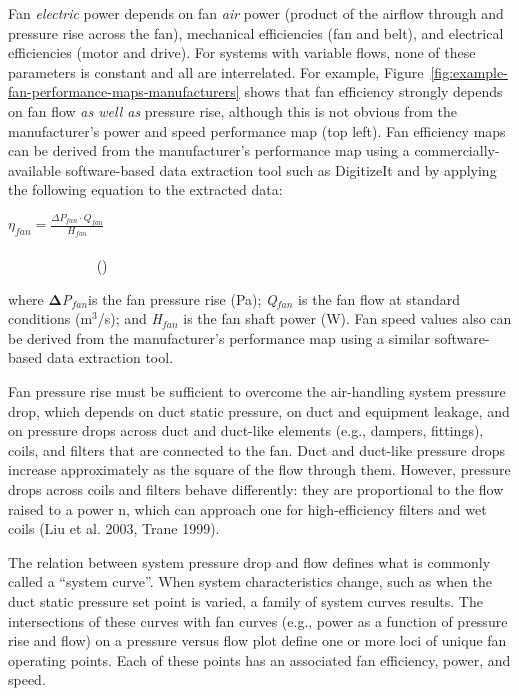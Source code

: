 Fan \emph{electric} power depends on fan \emph{air} power (product of the airflow through and pressure rise across the fan), mechanical efficiencies (fan and belt), and electrical efficiencies (motor and drive). For systems with variable flows, none of these parameters is constant and all are interrelated. For example, Figure~\ref{fig:example-fan-performance-maps-manufacturers} shows that fan efficiency strongly depends on fan flow \emph{as well as} pressure rise, although this is not obvious from the manufacturer's power and speed performance map (top left). Fan efficiency maps can be derived from the manufacturer's performance map using a commercially-available software-based data extraction tool such as DigitizeIt and by applying the following equation to the extracted data:

\({\eta_{fan}} = \frac{{\Delta {P_{fan}} \cdot {Q_{fan}}}}{{{H_{fan}}}}\) ~~~~~~~~~~~~~~~~~~~~~~~~~~~~~~~~~~~~~~~~~~~~~~~~~~~~~~~~~~~~~~~~~~~~~~~~~~~~~~~~~~~~ ()

where \textbf{Δ}\emph{P\(_{fan}\)}is the fan pressure rise (Pa); \emph{Q\(_{fan}\)} is the fan flow at standard conditions (m\(^{3}\)/s); and \emph{H\(_{fan}\)} is the fan shaft power (W). Fan speed values also can be derived from the manufacturer's performance map using a similar software-based data extraction tool.

Fan pressure rise must be sufficient to overcome the air-handling system pressure drop, which depends on duct static pressure, on duct and equipment leakage, and on pressure drops across duct and duct-like elements (e.g., dampers, fittings), coils, and filters that are connected to the fan. Duct and duct-like pressure drops increase approximately as the square of the flow through them. However, pressure drops across coils and filters behave differently: they are proportional to the flow raised to a power n, which can approach one for high-efficiency filters and wet coils (Liu et al. 2003, Trane 1999).

The relation between system pressure drop and flow defines what is commonly called a ``system curve''. When system characteristics change, such as when the duct static pressure set point is varied, a family of system curves results. The intersections of these curves with fan curves (e.g., power as a function of pressure rise and flow) on a pressure versus flow plot define one or more loci of unique fan operating points. Each of these points has an associated fan efficiency, power, and speed.

